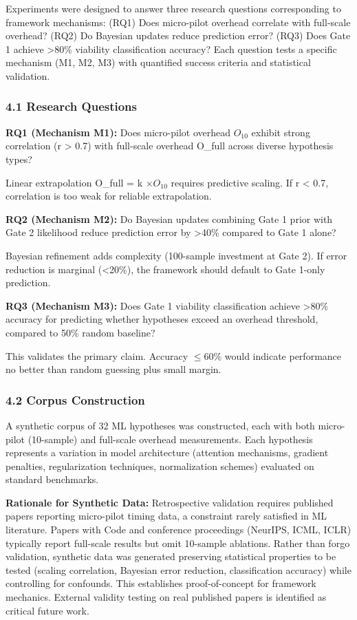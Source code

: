 
Experiments were designed to answer three research questions corresponding to framework mechanisms: (RQ1) Does micro-pilot overhead correlate with full-scale overhead? (RQ2) Do Bayesian updates reduce prediction error? (RQ3) Does Gate 1 achieve >80\% viability classification accuracy? Each question tests a specific mechanism (M1, M2, M3) with quantified success criteria and statistical validation.

\subsubsection{4.1 Research Questions}

\textbf{RQ1 (Mechanism M1):} Does micro-pilot overhead $O_{10}$ exhibit strong correlation (r > 0.7) with full-scale overhead O\_full across diverse hypothesis types?

Linear extrapolation O\_full = k $\times O_{10}$ requires predictive scaling. If r < 0.7, correlation is too weak for reliable extrapolation.

\textbf{RQ2 (Mechanism M2):} Do Bayesian updates combining Gate 1 prior with Gate 2 likelihood reduce prediction error by >40\% compared to Gate 1 alone?

Bayesian refinement adds complexity (100-sample investment at Gate 2). If error reduction is marginal (<20\%), the framework should default to Gate 1-only prediction.

\textbf{RQ3 (Mechanism M3):} Does Gate 1 viability classification achieve >80\% accuracy for predicting whether hypotheses exceed an overhead threshold, compared to 50\% random baseline?

This validates the primary claim. Accuracy $\leq 60$\% would indicate performance no better than random guessing plus small margin.

\subsubsection{4.2 Corpus Construction}

A synthetic corpus of 32 ML hypotheses was constructed, each with both micro-pilot (10-sample) and full-scale overhead measurements. Each hypothesis represents a variation in model architecture (attention mechanisms, gradient penalties, regularization techniques, normalization schemes) evaluated on standard benchmarks.

\textbf{Rationale for Synthetic Data:} Retrospective validation requires published papers reporting micro-pilot timing data, a constraint rarely satisfied in ML literature. Papers with Code and conference proceedings (NeurIPS, ICML, ICLR) typically report full-scale results but omit 10-sample ablations. Rather than forgo validation, synthetic data was generated preserving statistical properties to be tested (scaling correlation, Bayesian error reduction, classification accuracy) while controlling for confounds. This establishes proof-of-concept for framework mechanics. External validity testing on real published papers is identified as critical future work.

